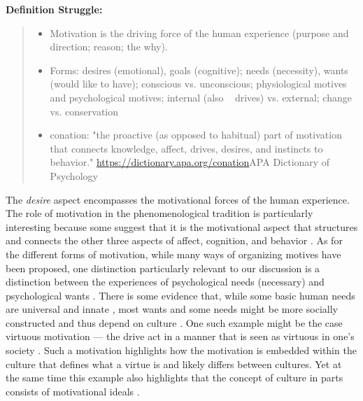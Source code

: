 \documentclass[nobib]{tufte-handout}
\begin{document}
\begin{framed}
    \textbf{Definition Struggle:}\\ 
    \begin{quote}
        \begin{itemize}
            \item Motivation is the driving force of the human experience (purpose and direction; reason; the why).
            \item Forms: desires (emotional), goals (cognitive); needs (necessity), wants (would like to have); conscious vs. unconscious; physiological motives and psychological motives; internal (also ~ drives) vs. external; change vs. conservation
            \item conation: "the proactive (as opposed to habitual) part of motivation that connects knowledge, affect, drives, desires, and instincts to behavior." \url{https://dictionary.apa.org/conation}{APA Dictionary of Psychology}
        \end{itemize}
    \end{quote}
\end{framed}

The \textit{desire} aspect  encompasses the motivational forces of the human experience. The role of motivation in the phenomenological tradition is particularly interesting because some suggest that it is the motivational aspect that structures and connects the other three aspects of affect, cognition, and behavior \citep[e.g.,][]{Hilgard1980}. As for the different forms of motivation, while many ways of organizing motives have been proposed, one distinction particularly relevant to our discussion is a distinction between the experiences of psychological needs (necessary) and psychological wants \citep[desired without necessity][]{Esposti2015}. There is some evidence that, while some basic human needs are universal and innate \citep[e.g.,][]{Ryan2000}, most wants and some needs might be more socially constructed and thus depend on culture \citep[e.g.,][]{McInerney2016, Morling2017}. One such example might be the case virtuous motivation --- the drive act in a manner that is seen as virtuous in one's society \citep{Stohr2017}. Such a motivation highlights how the motivation is embedded within the culture that defines what a virtue is and likely differs between cultures. Yet at the same time this example also highlights that the concept of culture in parts consists of motivational ideals \citep[or oughts; e.g., see][]{Markus1991}.
\end{document}
